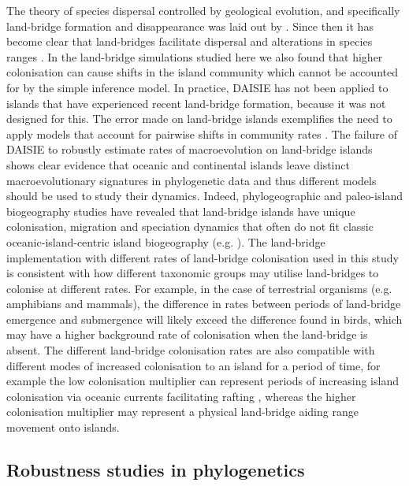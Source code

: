 \documentclass{article}
\begin{document}
The theory of species dispersal controlled by geological evolution, and specifically land-bridge formation and disappearance was laid out by \cite{simpson_mammals_1940}. Since then it has become clear that land-bridges facilitate dispersal and alterations in species ranges \citep{wilcox_supersaturated_1978}. In the land-bridge simulations studied here we also found that higher colonisation can cause shifts in the island community which cannot be accounted for by the simple inference model. In practice, DAISIE has not been applied to islands that have experienced recent land-bridge formation, because it was not designed for this. The error made on land-bridge islands exemplifies the need to apply models that account for pairwise shifts in community rates \citep{hauffe_lake_2020}. The failure of DAISIE to robustly estimate rates of macroevolution on land-bridge islands shows clear evidence that oceanic and continental islands leave distinct macroevolutionary signatures in phylogenetic data and thus different models should be used to study their dynamics. Indeed, phylogeographic and paleo-island biogeography studies have revealed that land-bridge islands have unique colonisation, migration and speciation dynamics that often do not fit classic oceanic-island-centric island biogeography (e.g. \cite{papadopoulou_genomic_2015, hammoud_past_2021}).  The land-bridge implementation with different rates of land-bridge colonisation used in this study is consistent with how different taxonomic groups may utilise land-bridges to colonise at different rates. For example, in the case of terrestrial organisms (e.g. amphibians and mammals), the difference in rates between periods of land-bridge emergence and submergence will likely exceed the difference found in birds, which may have a higher background rate of colonisation when the land-bridge is absent. The different land-bridge colonisation rates are also compatible with different modes of increased colonisation to an island for a period of time, for example the low colonisation multiplier can represent periods of increasing island colonisation via oceanic currents facilitating rafting \citep{ali_mammalian_2010}, whereas the higher colonisation multiplier may represent a physical land-bridge aiding range movement onto islands. 

\subsection*{Robustness studies in phylogenetics}
\end{document}
